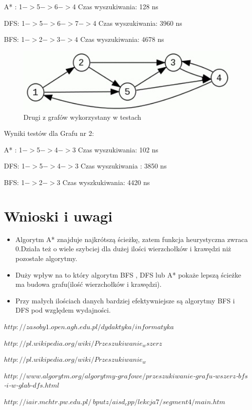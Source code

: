 \documentclass[11pt]{article}
\begin{document}
 A* :
 1$->$5$->$6$->$4 Czas wyszukiwania: 128 ns
 
 DFS:
 1$->$5$->$6$->$7$->$4 Czas wyszukiwania:  3960 ns
 
 BFS:
 1$->$2$->$3$->4$ Czas wyszukiwania:  4678 ns
 
 
  \begin{figure}[ht!] 
\centering
 \includegraphics[width=120mm]{graphchart2}
 \caption{Drugi z grafów wykorzystany w testach} 
\label{overflow}
 \end{figure}
 Wyniki testów dla Grafu nr 2:
 
 A* :
 1$->$5$->$4$->$3 Czas wyszukiwania: 102 ns
 
 DFS:
 1$->$5$->$4$->$3 Czas wyszukiwania : 3850 ns
 
 BFS:
 1$->$2$->$3    Czas wyszkukiwania: 4420 ns
 
 \newpage
 \section{Wnioski i uwagi}
 \begin{itemize}
 \item Algorytm A* znajduje najkrótszą ścieżkę, zatem funkcja heurystyczna zwraca 0.Działa też o wiele szybciej dla dużej ilości wierzchołków i krawędzi niż pozostałe algorytmy.
 \item Duży wpływ na to który algorytm BFS , DFS lub A* pokaże lepszą ścieżke ma budowa grafu(ilość wierzchołków i krawędzi).
 \item Przy małych ilościach danych bardziej efektywniejsze są algorytmy BFS i DFS pod względem wydajności.
 \end{itemize}
  \newpage
\begin{thebibliography}{99}

\emph{$http://zasoby1.open.agh.edu.pl/dydaktyka/informatyka$}

\emph{$http://pl.wikipedia.org/wiki/Przeszukiwanie_wszerz$}

\emph{$http://pl.wikipedia.org/wiki/Przeszukiwanie_w$}

\emph{$http://www.algorytm.org/algorytmy$-$grafowe/przeszukiwanie$-$grafu$-$wszerz$-$bfs$-$i$-$w$-$glab$-$dfs.html$}

\emph{$http://iair.mchtr.pw.edu.pl/~bputz/aisd_cpp/lekcja7/segment4/main.htm$}
\end{thebibliography}
\end{document}
